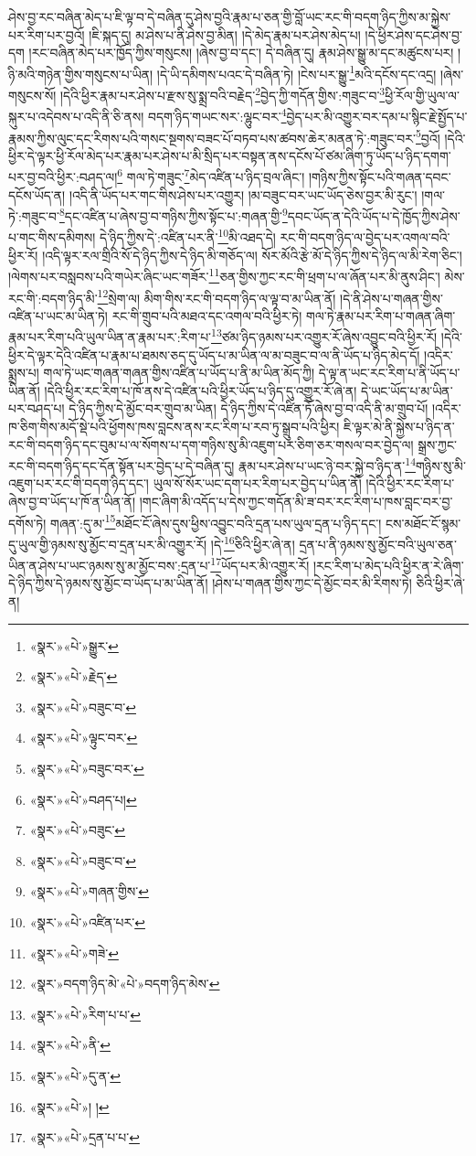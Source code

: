 ཤེས་བྱ་རང་བཞིན་མེད་པ་ཇི་ལྟ་བ་དེ་བཞིན་དུ་ཤེས་བྱའི་རྣམ་པ་ཅན་གྱི་བློ་ཡང་རང་གི་བདག་ཉིད་ཀྱིས་མ་སྐྱེས་པར་རིག་པར་བྱའོ། །ཇི་སྐད་དུ། མ་ཤེས་པ་ནི་ཤེས་བྱ་མིན། །དེ་མེད་རྣམ་པར་ཤེས་མེད་པ། །དེ་ཕྱིར་ཤེས་དང་ཤེས་བྱ་དག །རང་བཞིན་མེད་པར་ཁྱོད་ཀྱིས་གསུངས། །ཞེས་བྱ་བ་དང་། དེ་བཞིན་དུ། རྣམ་ཤེས་སྒྱུ་མ་དང་མཚུངས་པར། །ཉི་མའི་གཉེན་གྱིས་གསུངས་པ་ཡིན། །དེ་ཡི་དམིགས་པའང་དེ་བཞིན་ཏེ། །ངེས་པར་སྒྱུ་\footnote{«སྣར་»«པེ་»སྒྱུར་}མའི་དངོས་དང་འདྲ། །ཞེས་གསུངས་སོ། །དེའི་ཕྱིར་རྣམ་པར་ཤེས་པ་རྫས་སུ་སྨྲ་བའི་བརྗེད་\footnote{«སྣར་»«པེ་»རྗེད་}བྱེད་ཀྱི་གདོན་གྱིས་:གཟུང་བ་\footnote{«སྣར་»«པེ་»བཟུང་བ་}ཕྱི་རོལ་གྱི་ཡུལ་ལ་སྐུར་པ་འདེབས་པ་འདི་ནི་ཅི་ནས། བདག་ཉིད་གཡང་སར་:ལྷུང་བར་\footnote{«སྣར་»«པེ་»ལྟུང་བར་}བྱེད་པར་མི་འགྱུར་བར་དམ་པ་སྙིང་རྗེ་སྤྱོད་པ་རྣམས་ཀྱིས་ལུང་དང་རིགས་པའི་གསང་སྔགས་བཟང་པོ་བཏབ་པས་ཚབས་ཆེར་མནན་ཏེ་:གཟུང་བར་\footnote{«སྣར་»«པེ་»བཟུང་བར་}བྱའོ། །དེའི་ཕྱིར་དེ་ལྟར་ཕྱི་རོལ་མེད་པར་རྣམ་པར་ཤེས་པ་མི་སྲིད་པར་བསྟན་ནས་དངོས་པོ་ཙམ་ཞིག་ཏུ་ཡོད་པ་ཉིད་དགག་པར་བྱ་བའི་ཕྱིར་:བཤད་ལ།\footnote{«སྣར་»«པེ་»བཤད་པ།} གལ་ཏེ་གཟུང་\footnote{«སྣར་»«པེ་»བཟུང་}མེད་འཛིན་པ་ཉིད་བྲལ་ཞིང་། །གཉིས་ཀྱིས་སྟོང་པའི་གཞན་དབང་དངོས་ཡོད་ན། །འདི་ནི་ཡོད་པར་གང་གིས་ཤེས་པར་འགྱུར། །མ་བཟུང་བར་ཡང་ཡོད་ཅེས་བྱར་མི་རུང་། །གལ་ཏེ་:གཟུང་བ་\footnote{«སྣར་»«པེ་»བཟུང་བ་}དང་འཛིན་པ་ཞེས་བྱ་བ་གཉིས་ཀྱིས་སྟོང་པ་:གཞན་གྱི་\footnote{«སྣར་»«པེ་»གཞན་གྱིས་}དབང་ཡོད་ན་དེའི་ཡོད་པ་དེ་ཁྱོད་ཀྱིས་ཤེས་པ་གང་གིས་དམིགས། དེ་ཉིད་ཀྱིས་དེ་:འཛིན་པར་ནི་\footnote{«སྣར་»«པེ་»འཛིན་པར་}མི་འཐད་དེ། རང་གི་བདག་ཉིད་ལ་བྱེད་པར་འགལ་བའི་ཕྱིར་རོ། །འདི་ལྟར་རལ་གྲིའི་སོ་དེ་ཉིད་ཀྱིས་དེ་ཉིད་མི་གཅོད་ལ། སོར་མོའི་རྩེ་མོ་དེ་ཉིད་ཀྱིས་དེ་ཉིད་ལ་མི་རེག་ཅིང་། །ལེགས་པར་བསླབས་པའི་གཡེར་ཞིང་ཡང་གཟོར་\footnote{«སྣར་»«པེ་»གཟེ་}ཅན་གྱིས་ཀྱང་རང་གི་ཕྲག་པ་ལ་ཞོན་པར་མི་ནུས་ཤིང་། མེས་རང་གི་:བདག་ཉིད་མི་\footnote{«སྣར་»བདག་ཉིད་མེ་«པེ་»བདག་ཉིད་མེས་}སྲེག་ལ། མིག་གིས་རང་གི་བདག་ཉིད་ལ་ལྟ་བ་མ་ཡིན་ནོ། །དེ་ནི་ཤེས་པ་གཞན་གྱིས་འཛིན་པ་ཡང་མ་ཡིན་ཏེ། རང་གི་གྲུབ་པའི་མཐའ་དང་འགལ་བའི་ཕྱིར་ཏེ། གལ་ཏེ་རྣམ་པར་རིག་པ་གཞན་ཞིག་རྣམ་པར་རིག་པའི་ཡུལ་ཡིན་ན་རྣམ་པར་:རིག་པ་\footnote{«སྣར་»«པེ་»རིག་པ་པ་}ཙམ་ཉིད་ཉམས་པར་འགྱུར་རོ་ཞེས་འབྱུང་བའི་ཕྱིར་རོ། །དེའི་ཕྱིར་དེ་ལྟར་དེའི་འཛིན་པ་རྣམ་པ་ཐམས་ཅད་དུ་ཡོད་པ་མ་ཡིན་ལ་མ་བཟུང་བ་ལ་ནི་ཡོད་པ་ཉིད་མེད་དོ། །འདིར་སྨྲས་པ། གལ་ཏེ་ཡང་གཞན་གཞན་གྱིས་འཛིན་པ་ཡོད་པ་ནི་མ་ཡིན་མོད་ཀྱི། དེ་ལྟ་ན་ཡང་རང་རིག་པ་ནི་ཡོད་པ་ཡིན་ནོ། །དེའི་ཕྱིར་རང་རིག་པ་ཁོ་ནས་དེ་འཛིན་པའི་ཕྱིར་ཡོད་པ་ཉིད་དུ་འགྱུར་རོ་ཞེ་ན། དེ་ཡང་ཡོད་པ་མ་ཡིན་པར་བཤད་པ། དེ་ཉིད་ཀྱིས་དེ་མྱོང་བར་གྲུབ་མ་ཡིན། དེ་ཉིད་ཀྱིས་དེ་འཛིན་ཏོ་ཞེས་བྱ་བ་འདི་ནི་མ་གྲུབ་པོ། །འདིར་ཁ་ཅིག་གིས་མདོ་སྡེ་པའི་ཕྱོགས་ཁས་བླངས་ནས་རང་རིག་པ་རབ་ཏུ་སྒྲུབ་པའི་ཕྱིར། ཇི་ལྟར་མེ་ནི་སྐྱེས་པ་ཉིད་ན་རང་གི་བདག་ཉིད་དང་བུམ་པ་ལ་སོགས་པ་དག་གཉིས་སུ་མི་འཇུག་པར་ཅིག་ཅར་གསལ་བར་བྱེད་ལ། སྒྲས་ཀྱང་རང་གི་བདག་ཉིད་དང་དོན་སྟོན་པར་བྱེད་པ་དེ་བཞིན་དུ། རྣམ་པར་ཤེས་པ་ཡང་ཉེ་བར་སྐྱེ་བ་ཉིད་ན་\footnote{«སྣར་»«པེ་»ནི་}གཉིས་སུ་མི་འཇུག་པར་རང་གི་བདག་ཉིད་དང་། ཡུལ་སོ་སོར་ཡང་དག་པར་རིག་པར་བྱེད་པ་ཡིན་ནོ། །དེའི་ཕྱིར་རང་རིག་པ་ཞེས་བྱ་བ་ཡོད་པ་ཁོ་ན་ཡིན་ནོ། །གང་ཞིག་མི་འདོད་པ་དེས་ཀྱང་གདོན་མི་ཟ་བར་རང་རིག་པ་ཁས་བླང་བར་བྱ་དགོས་ཏེ། གཞན་:དུ་མ་\footnote{«སྣར་»«པེ་»དུ་ན་}མཐོང་ངོ་ཞེས་དུས་ཕྱིས་འབྱུང་བའི་དྲན་པས་ཡུལ་དྲན་པ་ཉིད་དང་། ངས་མཐོང་ངོ་སྙམ་དུ་ཡུལ་གྱི་ཉམས་སུ་མྱོང་བ་དྲན་པར་མི་འགྱུར་རོ། །དེ་\footnote{«སྣར་»«པེ་»། །}ཅིའི་ཕྱིར་ཞེ་ན། དྲན་པ་ནི་ཉམས་སུ་མྱོང་བའི་ཡུལ་ཅན་ཡིན་ན་ཤེས་པ་ཡང་ཉམས་སུ་མ་མྱོང་བས་:དྲན་པ་\footnote{«སྣར་»«པེ་»དྲན་པ་པ་}ཡོད་པར་མི་འགྱུར་རོ། །རང་རིག་པ་མེད་པའི་ཕྱིར་ན་རེ་ཞིག་དེ་ཉིད་ཀྱིས་དེ་ཉམས་སུ་མྱོང་བ་ཡོད་པ་མ་ཡིན་ནོ། །ཤེས་པ་གཞན་གྱིས་ཀྱང་དེ་མྱོང་བར་མི་རིགས་ཏེ། ཅིའི་ཕྱིར་ཞེ་ན། 